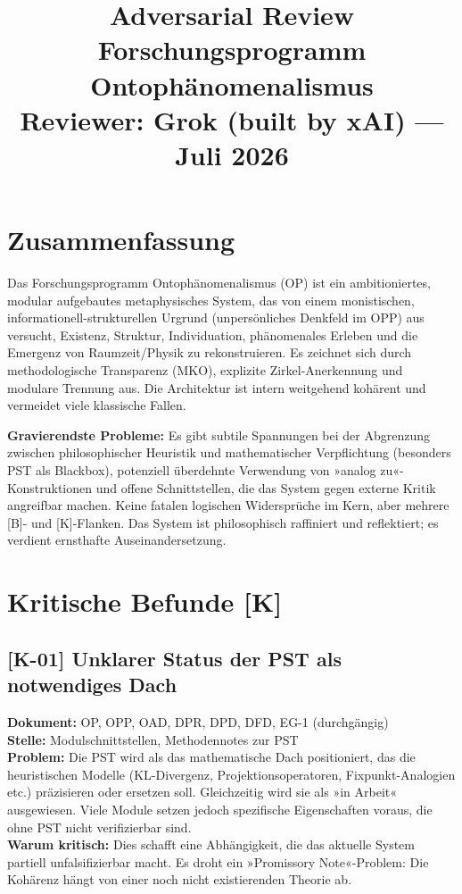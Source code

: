 \documentclass[11pt,a4paper]{article}
\title{
  \textbf{Adversarial Review}\\
  \textbf{Forschungsprogramm Ontophänomenalismus}\\[0.4em]
  {\normalsize Reviewer: Grok (built by xAI) --- Juli 2026}
}
\author{}
\date{}
\begin{document}
\maketitle

\section*{Zusammenfassung}
Das Forschungsprogramm Ontophänomenalismus (OP) ist ein ambitioniertes, modular aufgebautes metaphysisches System, das von einem monistischen, informationell-strukturellen Urgrund (unpersönliches Denkfeld im OPP) aus versucht, Existenz, Struktur, Individuation, phänomenales Erleben und die Emergenz von Raumzeit/Physik zu rekonstruieren. Es zeichnet sich durch methodologische Transparenz (MKO), explizite Zirkel-Anerkennung und modulare Trennung aus. Die Architektur ist intern weitgehend kohärent und vermeidet viele klassische Fallen.

\textbf{Gravierendste Probleme:} Es gibt subtile Spannungen bei der Abgrenzung zwischen philosophischer Heuristik und mathematischer Verpflichtung (besonders PST als Blackbox), potenziell überdehnte Verwendung von »analog zu«-Konstruktionen und offene Schnittstellen, die das System gegen externe Kritik angreifbar machen. Keine fatalen logischen Widersprüche im Kern, aber mehrere [B]- und [K]-Flanken. Das System ist philosophisch raffiniert und reflektiert; es verdient ernsthafte Auseinandersetzung.

\section*{Kritische Befunde [K]}

\subsection*{[K-01] Unklarer Status der PST als notwendiges Dach}
\textbf{Dokument:} OP, OPP, OAD, DPR, DPD, DFD, EG-1 (durchgängig)\\
\textbf{Stelle:} Modulschnittstellen, Methodennotes zur PST\\
\textbf{Problem:} Die PST wird als das mathematische Dach positioniert, das die heuristischen Modelle (KL-Divergenz, Projektionsoperatoren, Fixpunkt-Analogien etc.) präzisieren oder ersetzen soll. Gleichzeitig wird sie als »in Arbeit« ausgewiesen. Viele Module setzen jedoch spezifische Eigenschaften voraus, die ohne PST nicht verifizierbar sind.\\
\textbf{Warum kritisch:} Dies schafft eine Abhängigkeit, die das aktuelle System partiell unfalsifizierbar macht. Es droht ein »Promissory Note«-Problem: Die Kohärenz hängt von einer noch nicht existierenden Theorie ab.
\end{document}
